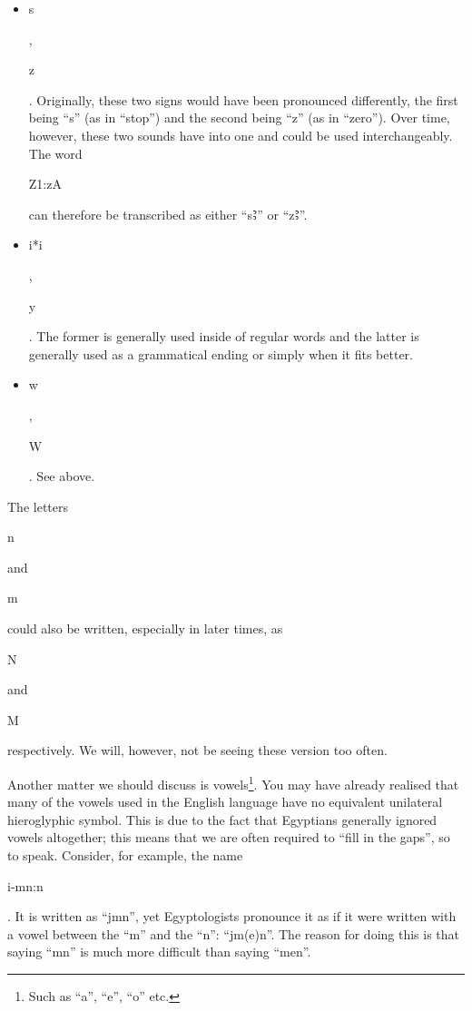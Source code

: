 \documentclass[a5paper,twoside,11pt]{report}
\newcommand{\AHiero}{{\fontspec{DejaVu Sans}Ꜣ}}
\begin{document}
    \begin{itemize}
			\item \begin{hieroglyph}s\end{hieroglyph}, \begin{hieroglyph}z\end{hieroglyph}. Originally, these two signs would have been pronounced differently, the first being “s” (as in “stop”) and the second being “z” (as in “zero”). Over time, however, these two sounds have into one and could be used interchangeably. The word \begin{hieroglyph}Z1:\!\!\!\!\!zA\end{hieroglyph} can therefore be transcribed as either “s\AHiero” or “z\AHiero”.
			\item \begin{hieroglyph}i*i\end{hieroglyph}, \begin{hieroglyph}y\end{hieroglyph}. The former is generally used inside of regular words and the latter is generally used as a grammatical ending or simply when it fits better.
			\item \begin{hieroglyph}w\end{hieroglyph}, \begin{hieroglyph}W\end{hieroglyph}. See above.
    \end{itemize}

		The letters \begin{hieroglyph}n\end{hieroglyph} and \begin{hieroglyph}m\end{hieroglyph} could also be written, especially in later times, as \begin{hieroglyph}N\end{hieroglyph} and \begin{hieroglyph}M\end{hieroglyph} respectively. We will, however, not be seeing these version too often.

		Another matter we should discuss is vowels\footnote{Such as “a”, “e”, “o” etc.}. You may have already realised that many of the vowels used in the English language have no equivalent unilateral hieroglyphic symbol. This is due to the fact that Egyptians generally ignored vowels altogether; this means that we are often required to “fill in the gaps”, so to speak. Consider, for example, the name \begin{hieroglyph}i-mn:n\end{hieroglyph}. It is written as “jmn”, yet Egyptologists pronounce it as if it were written with a vowel between the “m” and the “n”: “jm(e)n”. The reason for doing this is that saying “mn” is much more difficult than saying “men”.
\end{document}
